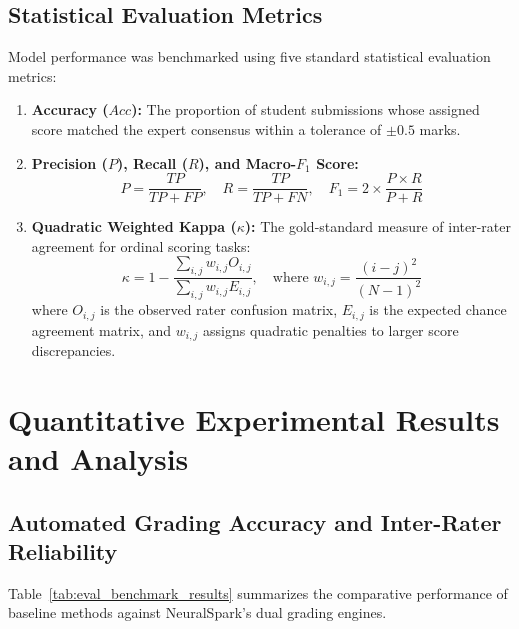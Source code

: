 \subsection{Statistical Evaluation Metrics}
Model performance was benchmarked using five standard statistical evaluation metrics:
\begin{enumerate}[leftmargin=*]
    \item \textbf{Accuracy ($Acc$):} The proportion of student submissions whose assigned score matched the expert consensus within a tolerance of $\pm 0.5$ marks.
    \item \textbf{Precision ($P$), Recall ($R$), and Macro-$F_1$ Score:}
    \begin{equation}
        P = \frac{TP}{TP + FP}, \quad R = \frac{TP}{TP + FN}, \quad F_1 = 2 \times \frac{P \times R}{P + R}
    \end{equation}
    \item \textbf{Quadratic Weighted Kappa ($\kappa$):} The gold-standard measure of inter-rater agreement for ordinal scoring tasks:
    \begin{equation}
        \kappa = 1 - \frac{\sum_{i,j} w_{i,j} O_{i,j}}{\sum_{i,j} w_{i,j} E_{i,j}}, \quad \text{where } w_{i,j} = \frac{(i - j)^2}{(N - 1)^2}
    \end{equation}
    where $O_{i,j}$ is the observed rater confusion matrix, $E_{i,j}$ is the expected chance agreement matrix, and $w_{i,j}$ assigns quadratic penalties to larger score discrepancies.
\end{enumerate}

\section{Quantitative Experimental Results and Analysis}

\subsection{Automated Grading Accuracy and Inter-Rater Reliability}
Table~\ref{tab:eval_benchmark_results} summarizes the comparative performance of baseline methods against NeuralSpark's dual grading engines.

